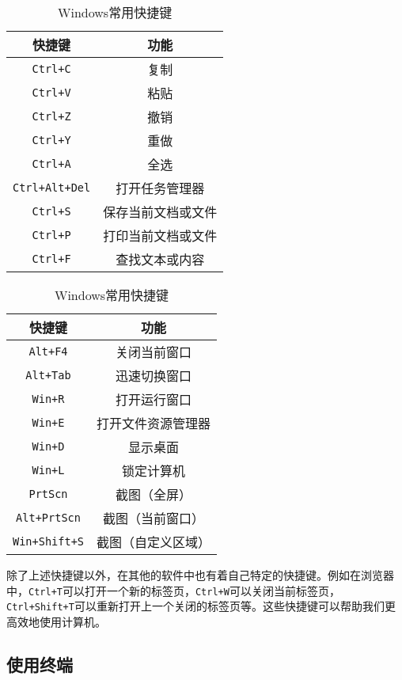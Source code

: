 \begin{table}[ht]
  \centering
  \caption{Windows常用快捷键}
  \label{tab:windows-shortcuts}
  \begin{tabular}[t]{c|c}
    \hline
    \textbf{快捷键} & \textbf{功能} \\
    \hline
    \texttt{Ctrl+C} & 复制 \\
    \texttt{Ctrl+V} & 粘贴 \\
    \texttt{Ctrl+Z} & 撤销 \\
    \texttt{Ctrl+Y} & 重做 \\
    \texttt{Ctrl+A} & 全选 \\
    \texttt{Ctrl+Alt+Del} & 打开任务管理器 \\
    \texttt{Ctrl+S} & 保存当前文档或文件 \\
    \texttt{Ctrl+P} & 打印当前文档或文件 \\
    \texttt{Ctrl+F} & 查找文本或内容 \\
    \hline
  \end{tabular}
  \qquad
  \begin{tabular}[t]{c|c}
    \hline
    \textbf{快捷键} & \textbf{功能} \\
    \hline
    \texttt{Alt+F4} & 关闭当前窗口 \\
    \texttt{Alt+Tab} & 迅速切换窗口 \\
    \texttt{Win+R} & 打开运行窗口 \\
    \texttt{Win+E} & 打开文件资源管理器 \\
    \texttt{Win+D} & 显示桌面 \\
    \texttt{Win+L} & 锁定计算机 \\
    \texttt{PrtScn} & 截图（全屏） \\
    \texttt{Alt+PrtScn} & 截图（当前窗口） \\
    \texttt{Win+Shift+S} & 截图（自定义区域） \\
    \hline
  \end{tabular}
\end{table}

除了上述快捷键以外，在其他的软件中也有着自己特定的快捷键。例如在浏览器中，\texttt{Ctrl+T}可以打开一个新的标签页，\texttt{Ctrl+W}可以关闭当前标签页，\texttt{Ctrl+Shift+T}可以重新打开上一个关闭的标签页等。这些快捷键可以帮助我们更高效地使用计算机。

\subsection{使用终端}\label{sec:terminal}

